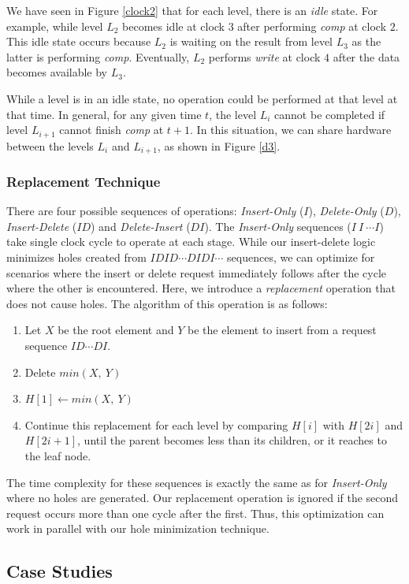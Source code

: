 We have seen in Figure \ref{clock2} that for each level, there is an {\it idle} state.
For example, while level $L_2$ becomes idle at clock $3$ after performing {\it comp} at clock $2$.
This idle state occurs because $L_2$ is waiting on the result from level $L_3$ as the latter is performing {\it comp}.
Eventually, $L_2$ performs {\it write} at clock $4$ after the data becomes available by $L_3$.

While a level is in an idle state, no operation could be performed at that level at that time.
In general, for any given time $t$, the level $L_i$ cannot be completed if level $L_{i+1}$ cannot finish {\it comp} at $t+1$.
In this situation, we can share hardware between the levels $L_i$ and $L_{i+1}$, as shown in Figure \ref{d3}.

\subsubsection{Replacement Technique}
There are four possible sequences of operations: {\it Insert-Only} ($I$), {\it Delete-Only} ($D$), {\it Insert-Delete} ($ID$) and {\it Delete-Insert} ($DI$).
The {\it Insert-Only} sequences ($I \ I \ \cdots I $) take single clock cycle to operate at each stage.
While our insert-delete logic minimizes holes created from $IDID \cdots DIDI \cdots$ sequences, we can optimize for scenarios where the insert or delete request immediately follows after the cycle where the other is encountered.
Here, we introduce a {\it replacement} operation that does not cause holes.
The algorithm of this operation is as follows:
 \begin{enumerate}
 \item Let $X$ be the root element and $Y$ be the element to insert from a request sequence $ID \cdots DI$.
 \item Delete $min(X, \ Y)$
 \item $H[1] \leftarrow min(X,\ Y)$
 \item Continue this replacement for each level by comparing $H[i]$ with $H[2i]$ and $H[2i+1]$, until the parent becomes less than its children, or it reaches to the leaf node.
 \end{enumerate}
The time complexity for these sequences is exactly the same as for {\it Insert-Only} where no holes are generated.
Our replacement operation is ignored if the second request occurs more than one cycle after the first.
Thus, this optimization can work in parallel with our hole minimization technique.


\subsection{Case Studies}

